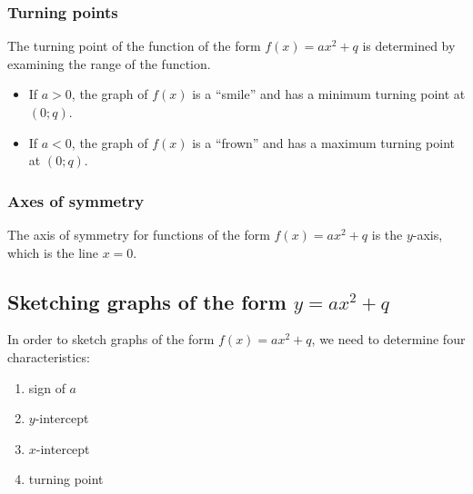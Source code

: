 \subsubsection*{Turning points}

The turning point of the function of the form $f(x)=ax^{2}+q$ is determined by examining the range of the function. 
\begin{itemize}
 \item If $a>0$, the graph of $f(x)$ is a ``smile'' and has a minimum turning point at $(0;q)$.
\item If $a<0$, the graph of $f(x)$ is a ``frown'' and has a maximum turning point at $(0;q)$.
\end{itemize}


\subsubsection*{Axes of symmetry}

The axis of symmetry for functions of the form $f(x)=ax^{2}+q$ is the $y$-axis, which is the line $x=0$. 

\subsection*{Sketching graphs of the form $y=ax^{2}+q$}

In order to sketch graphs of the form $f(x)=ax^{2}+q$, we need to determine four characteristics:
\begin{enumerate}[noitemsep, label=\textbf{\arabic*}. ] 
\item sign of $a$
\item $y$-intercept
\item $x$-intercept
\item turning point

\end{enumerate}


